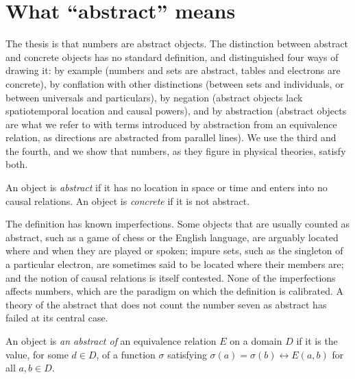 \documentclass{situationist-preprint}
\begin{document}
\section{What \enquote{abstract} means}\label{s:abstract}

The thesis is that numbers are abstract objects. The distinction between abstract and concrete objects has no standard definition, and \citet[\S1.7]{Lewis1986} distinguished four ways of drawing it: by example (numbers and sets are abstract, tables and electrons are concrete), by conflation with other distinctions (between sets and individuals, or between universals and particulars), by negation (abstract objects lack spatiotemporal location and causal powers), and by abstraction (abstract objects are what we refer to with terms introduced by abstraction from an equivalence relation, as directions are abstracted from parallel lines). We use the third and the fourth, and we show that numbers, as they figure in physical theories, satisfy both.

\begin{definition}\label{d:abs}
An object is \emph{abstract} if it has no location in space or time and enters into no causal relations. An object is \emph{concrete} if it is not abstract.
\end{definition}

The definition has known imperfections. Some objects that are usually counted as abstract, such as a game of chess or the English language, are arguably located where and when they are played or spoken; impure sets, such as the singleton of a particular electron, are sometimes said to be located where their members are; and the notion of causal relations is itself contested. None of the imperfections affects numbers, which are the paradigm on which the definition is calibrated. A theory of the abstract that does not count the number seven as abstract has failed at its central case.

\begin{definition}\label{d:abstraction}
An object is \emph{an abstract of} an equivalence relation $E$ on a domain $D$ if it is the value, for some $d \in D$, of a function $\sigma$ satisfying $\sigma(a) = \sigma(b) \leftrightarrow E(a,b)$ for all $a, b \in D$.
\end{definition}
\end{document}
